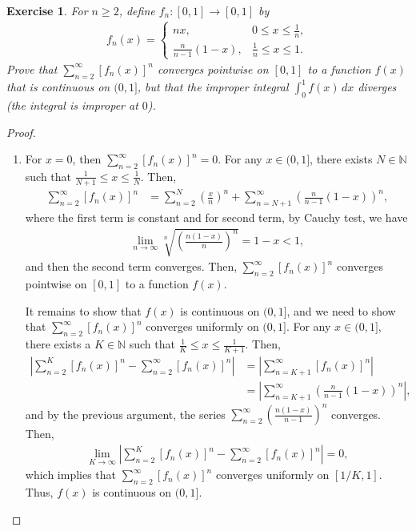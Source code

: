 \documentclass[11pt]{article}
\newtheorem{exercise}{Exercise}[section]
\theoremstyle{definition}
\numberwithin{equation}{subsection}
\begin{document}
\begin{exercise}{\rm *}
For $n \geq 2$, define $f_n: [0,1] \to [0,1]$ by
\begin{align*}
    f_n(x) = \begin{cases}
        nx, & 0 \leq x \leq \frac{1}{n}, \\
        \frac{n}{n-1}(1 - x), & \frac{1}{n} \leq x \leq 1.
    \end{cases}
\end{align*}
Prove that $\sum^\infty_{n=2} [f_n(x)]^n$ converges pointwise on $[0,1]$ to a function $f(x)$ that is continuous on $(0,1]$, but that the improper integral $\int^1_0 f(x)\, dx$ diverges (the integral is improper at $0$). 
\end{exercise}
\begin{proof}
~\begin{enumerate}[label=(\alph*)]
    \item For $x = 0$, then $\sum^\infty_{n=2} [f_n(x)]^n = 0$. For any $x \in (0,1]$, there exists $N \in \mathbb{N}$ such that $\frac{1}{N+1} \leq x \leq \frac{1}{N}$. Then,
    \begin{align*}
        \sum^\infty_{n=2} [f_n(x)]^n & = \sum^N_{n = 2} \left( \frac{x}{n} \right)^n + \sum^\infty_{n=N+1} \left( \frac{n}{n - 1} (1-x) \right)^n,
    \end{align*}
    where the first term is constant and for second term, by Cauchy test, we have
    \begin{align*}
        \lim_{n \to \infty} \sqrt[n]{\left( \frac{n(1 - x)}{n} \right)^n} = 1 - x < 1,
    \end{align*}
    and then the second term converges. Then, $\sum^\infty_{n=2} [f_n(x)]^n$ converges pointwise on $[0,1]$ to a function $f(x)$.
    
    
    It remains to show that $f(x)$ is continuous on $(0,1]$, and we need to show that $\sum^\infty_{n=2} [f_n(x)]^n$ converges uniformly on $(0,1]$. For any $x \in (0,1]$, there exists a $K \in \mathbb{N}$ such that $\frac{1}{K} \leq x \leq \frac{1}{K+1}$. Then, 
    \begin{align*}
        \left| \sum^K_{n=2} [f_n(x)]^n - \sum^\infty_{n=2} [f_n(x)]^n \right| & = \left| \sum^\infty_{n=K+1} [f_n(x)]^n\right| \\
        & = \left| \sum^\infty_{n=K+1} \left( \frac{n}{n - 1} (1-x) \right)^n \right|,
    \end{align*}
    and by the previous argument, the series $\sum^\infty_{n=2} \left(\frac{n(1-x)}{n-1}\right)^n$ converges. Then, 
    \begin{align*}
        \lim_{K \to \infty} \left| \sum^K_{n=2} [f_n(x)]^n - \sum^\infty_{n=2} [f_n(x)]^n \right| = 0,
    \end{align*}
    which implies that $\sum^\infty_{n=2} [f_n(x)]^n$ converges uniformly on $[1/K, 1]$. Thus, $f(x)$ is continuous on $(0,1]$.
    

\end{enumerate}
\end{proof}
\end{document}
